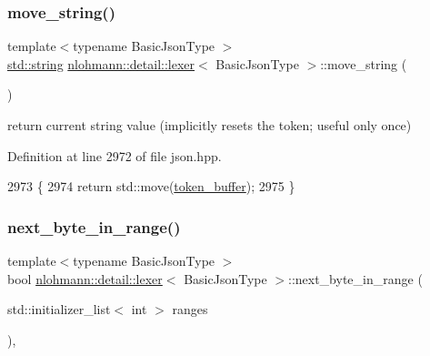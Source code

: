 \subsubsection{\texorpdfstring{move\+\_\+string()}{move\_string()}}
{\footnotesize\ttfamily template$<$typename Basic\+Json\+Type $>$ \\
\hyperlink{namespacenlohmann_1_1detail_a1ed8fc6239da25abcaf681d30ace4985ab45cffe084dd3d20d928bee85e7b0f21}{std\+::string} \hyperlink{classnlohmann_1_1detail_1_1lexer}{nlohmann\+::detail\+::lexer}$<$ Basic\+Json\+Type $>$\+::move\+\_\+string (\begin{DoxyParamCaption}{ }\end{DoxyParamCaption})\hspace{0.3cm}{\ttfamily [inline]}}



return current string value (implicitly resets the token; useful only once) 



Definition at line 2972 of file json.\+hpp.


\begin{DoxyCode}
2973     \{
2974         \textcolor{keywordflow}{return} std::move(\hyperlink{classnlohmann_1_1detail_1_1lexer_aaa7a7bba826023ee34e9c99d51d55468}{token\_buffer});
2975     \}
\end{DoxyCode}
\mbox{\label{classnlohmann_1_1detail_1_1lexer_a2faa544ab5475523ead81f9cdef41a0a}} 
\subsubsection{\texorpdfstring{next\+\_\+byte\+\_\+in\+\_\+range()}{next\_byte\_in\_range()}}
{\footnotesize\ttfamily template$<$typename Basic\+Json\+Type $>$ \\
bool \hyperlink{classnlohmann_1_1detail_1_1lexer}{nlohmann\+::detail\+::lexer}$<$ Basic\+Json\+Type $>$\+::next\+\_\+byte\+\_\+in\+\_\+range (\begin{DoxyParamCaption}\item[{std\+::initializer\+\_\+list$<$ int $>$}]{ranges }\end{DoxyParamCaption})\hspace{0.3cm}{\ttfamily [inline]}, {\ttfamily [private]}}



